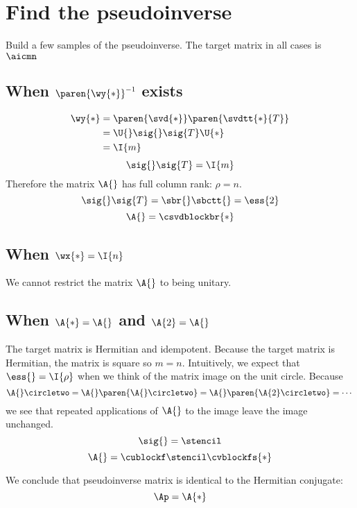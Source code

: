 \section{Find the pseudoinverse}
Build a few samples of the pseudoinverse. The target matrix in all cases is $\aicmn$

\subsection{When $\paren{\wy{*}}^{-1}$ exists}
\begin{equation}
  \begin{split}
    \wy{*} 
      &= \paren{\svd{*}} \paren{\svdtt{*}{T}} \\
      &= \U{} \sig{} \sig{T} \U{*} \\
      &= \I{m} \\
  \end{split}
\end{equation}
\begin{equation}
  \sig{} \sig{T} = \I{m}
\end{equation}
Therefore the matrix $\A{}$ has full column rank: $\rho = n$.
\begin{equation}
  \sig{} \sig{T} = \sbr{}\sbctt{} = \ess{2}
\end{equation}
\begin{equation}
  \A{} = \csvdblockbr{*}
\end{equation}



\subsection{When $\wx{*}=\I{n}$}
We cannot restrict the matrix $\A{}$ to being unitary.

\subsection{When $\A{*}=\A{}$ and $\A{2}=\A{}$}
The target matrix is Hermitian and idempotent. Because the target matrix is Hermitian, the matrix is square so $m = n$. Intuitively, we expect that $\ess{}=\I{\rho}$ when we think of the matrix image on the unit circle. Because
\begin{equation}
  \A{}\circletwo = \A{}\paren{\A{}\circletwo}  = \A{}\paren{\A{2}\circletwo} = \cdots
\end{equation}
we see that repeated applications of $\A{}$ to the image leave the image unchanged. 
\begin{equation}
  \sig{} = \stencil
\end{equation}
\begin{equation}
  \A{} = \cublockf \stencil \cvblockfs{ * }
\end{equation}


We conclude that pseudoinverse matrix is identical to the Hermitian conjugate:
\begin{equation}
  \Ap = \A{*}
\end{equation}



\endinput